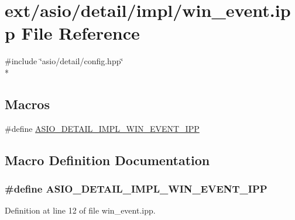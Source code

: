 \hypertarget{win__event_8ipp}{}\section{ext/asio/detail/impl/win\+\_\+event.ipp File Reference}
\label{win__event_8ipp}
{\ttfamily \#include \char`\"{}asio/detail/config.\+hpp\char`\"{}}\\*
\subsection*{Macros}
\begin{DoxyCompactItemize}
\item 
\#define \hyperlink{win__event_8ipp_ab850df46064857445be28e12f8af1e88}{A\+S\+I\+O\+\_\+\+D\+E\+T\+A\+I\+L\+\_\+\+I\+M\+P\+L\+\_\+\+W\+I\+N\+\_\+\+E\+V\+E\+N\+T\+\_\+\+I\+P\+P}
\end{DoxyCompactItemize}


\subsection{Macro Definition Documentation}
\hypertarget{win__event_8ipp_ab850df46064857445be28e12f8af1e88}{}
\subsubsection[{A\+S\+I\+O\+\_\+\+D\+E\+T\+A\+I\+L\+\_\+\+I\+M\+P\+L\+\_\+\+W\+I\+N\+\_\+\+E\+V\+E\+N\+T\+\_\+\+I\+P\+P}]{\setlength{\rightskip}{0pt plus 5cm}\#define A\+S\+I\+O\+\_\+\+D\+E\+T\+A\+I\+L\+\_\+\+I\+M\+P\+L\+\_\+\+W\+I\+N\+\_\+\+E\+V\+E\+N\+T\+\_\+\+I\+P\+P}\label{win__event_8ipp_ab850df46064857445be28e12f8af1e88}


Definition at line 12 of file win\+\_\+event.\+ipp.

